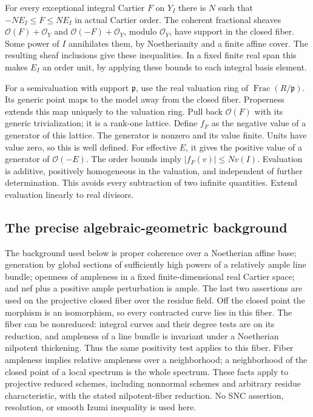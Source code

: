 \documentclass[11pt]{article}
\begin{document}
For every exceptional integral Cartier $F$ on $Y_I$ there is $N$ such that $-NE_I\le F\le NE_I$ in actual Cartier order. The coherent fractional sheaves $\mathcal O(F)+\mathcal O_Y$ and $\mathcal O(-F)+\mathcal O_Y$, modulo $\mathcal O_Y$, have support in the closed fiber. Some power of $I$ annihilates them, by Noetherianity and a finite affine cover. The resulting sheaf inclusions give these inequalities. In a fixed finite real span this makes $E_I$ an order unit, by applying these bounds to each integral basis element.

For a semivaluation with support $\mathfrak p$, use the real valuation ring of $\operatorname{Frac}(R/\mathfrak p)$. Its generic point maps to the model away from the closed fiber. Properness extends this map uniquely to the valuation ring. Pull back $\mathcal O(F)$ with its generic trivialization; it is a rank-one lattice. Define $f_F$ as the negative value of a generator of this lattice. The generator is nonzero and its value finite. Units have value zero, so this is well defined. For effective $E$, it gives the positive value of a generator of $\mathcal O(-E)$. The order bounds imply $|f_F(v)|\le Nv(I)$. Evaluation is additive, positively homogeneous in the valuation, and independent of further determination. This avoids every subtraction of two infinite quantities. Extend evaluation linearly to real divisors.

\subsection{The precise algebraic-geometric background}

The background used below is proper coherence over a Noetherian affine base; generation by global sections of sufficiently high powers of a relatively ample line bundle; openness of ampleness in a fixed finite-dimensional real Cartier space; and nef plus a positive ample perturbation is ample. The last two assertions are used on the projective closed fiber over the residue field. Off the closed point the morphism is an isomorphism, so every contracted curve lies in this fiber. The fiber can be nonreduced: integral curves and their degree tests are on its reduction, and ampleness of a line bundle is invariant under a Noetherian nilpotent thickening. Thus the same positivity test applies to this fiber. Fiber ampleness implies relative ampleness over a neighborhood; a neighborhood of the closed point of a local spectrum is the whole spectrum. These facts apply to projective reduced schemes, including nonnormal schemes and arbitrary residue characteristic, with the stated nilpotent-fiber reduction. No SNC assertion, resolution, or smooth Izumi inequality is used here.
\end{document}
